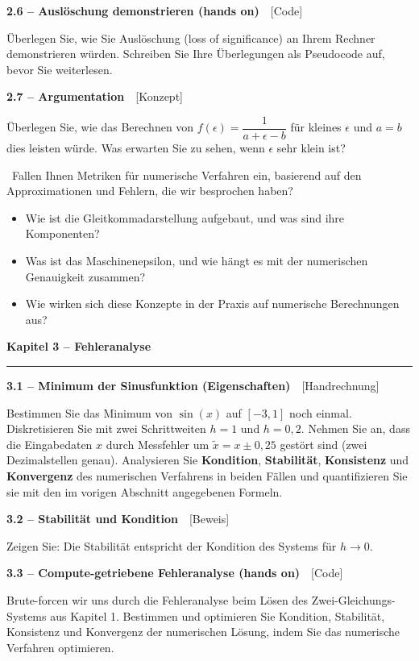 \documentclass[a4paper,10pt]{article}
\newcommand{\kapitel}[1]{%
  \par\vspace{7pt}
  {\large\bfseries\color{accent} #1}\par
  \noindent\textcolor{accent}{\rule{\linewidth}{0.8pt}}\par\vspace{2pt}}
\newcommand{\aufg}[2]{%
  \par\vspace{3pt}
  {\bfseries\color{accent2} #1}~~{\footnotesize\color{accent2}[#2]}\par\vspace{1pt}}
\newcommand{\teaser}[1]{%
  \par\vspace{2pt}{\color{accent4}\textbf{Denkanstoß.}}~#1\par}
\newcommand{\marg}[1]{\par\vspace{1pt}{\footnotesize\itshape Randnotiz: #1}\par}
\newcommand{\reflexion}{%
  \par\vspace{2pt}{\bfseries\color{accent3} Selbstreflexionsfragen}\par\vspace{1pt}}
\begin{document}
\aufg{2.6 \;--\; Auslöschung demonstrieren (hands on)}{Code}
Überlegen Sie, wie Sie Auslöschung (loss of significance) an Ihrem Rechner
demonstrieren würden. Schreiben Sie Ihre Überlegungen als Pseudocode auf, bevor Sie
weiterlesen.

\aufg{2.7 \;--\; Argumentation}{Konzept}
Überlegen Sie, wie das Berechnen von $f(\epsilon)=\dfrac{1}{a+\epsilon-b}$ für
kleines $\epsilon$ und $a=b$ dies leisten würde. Was erwarten Sie zu sehen, wenn
$\epsilon$ sehr klein ist?
\marg{Was passiert für $a>b$? Denken Sie in signifikanten Stellen.}

\teaser{Fallen Ihnen Metriken für numerische Verfahren ein, basierend auf den
Approximationen und Fehlern, die wir besprochen haben?}

\reflexion
\begin{itemize}
  \item Wie ist die Gleitkommadarstellung aufgebaut, und was sind ihre Komponenten?
  \item Was ist das Maschinenepsilon, und wie hängt es mit der numerischen
        Genauigkeit zusammen?
  \item Wie wirken sich diese Konzepte in der Praxis auf numerische Berechnungen aus?
\end{itemize}

\kapitel{Kapitel 3 \;--\; Fehleranalyse}

\aufg{3.1 \;--\; Minimum der Sinusfunktion (Eigenschaften)}{Handrechnung}
Bestimmen Sie das Minimum von $\sin(x)$ auf $[-3,1]$ noch einmal. Diskretisieren Sie
mit zwei Schrittweiten $h=1$ und $h=0{,}2$. Nehmen Sie an, dass die Eingabedaten $x$
durch Messfehler um $\tilde x=x\pm0{,}25$ gestört sind (zwei Dezimalstellen genau).
Analysieren Sie \textbf{Kondition}, \textbf{Stabilität}, \textbf{Konsistenz} und
\textbf{Konvergenz} des numerischen Verfahrens in beiden Fällen und quantifizieren Sie
sie mit den im vorigen Abschnitt angegebenen Formeln.

\aufg{3.2 \;--\; Stabilität und Kondition}{Beweis}
Zeigen Sie: Die Stabilität entspricht der Kondition des Systems für $h\to0$.

\aufg{3.3 \;--\; Compute-getriebene Fehleranalyse (hands on)}{Code}
Brute-forcen wir uns durch die Fehleranalyse beim Lösen des Zwei-Gleichungs-Systems
aus Kapitel 1. Bestimmen und optimieren Sie Kondition, Stabilität, Konsistenz und
Konvergenz der numerischen Lösung, indem Sie das numerische Verfahren optimieren.
\end{document}
